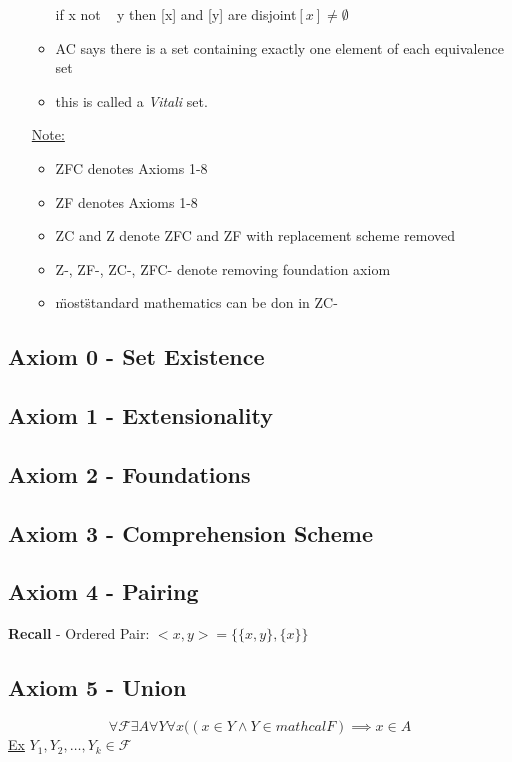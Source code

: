 \documentclass{article}
\begin{document}
\begin{itemize}
\begin{itemize}
            if x not ~ y then [x] and [y] are disjoint$ [x] \neq \emptyset$
            \item AC says there is a set containing exactly one element of each equivalence set
            \item this is called a \emph{Vitali} set.
        \end{itemize}

        \underline{Note:}
        \begin{itemize}
            \item ZFC denotes Axioms 1-8
            \item ZF denotes Axioms 1-8
            \item ZC and Z denote ZFC and ZF with replacement scheme removed
            \item Z-, ZF-, ZC-, ZFC- denote removing foundation axiom
            \item \"most\" standard mathematics can be don in ZC-
        \end{itemize}

    \end{itemize}


    \subsection{Axiom 0 - Set Existence}
    \subsection{Axiom 1 - Extensionality}
    \subsection{Axiom 2 - Foundations}
    \subsection{Axiom 3 - Comprehension Scheme}
    \subsection{Axiom 4 - Pairing}

    \textbf{Recall} - Ordered Pair: $<x,y> = \{\{x,y\},\{x\}\}$

    \subsection{Axiom 5 - Union}
    \[\forall \mathcal{F} \exists A \forall Y \forall x ((x \in Y \wedge Y \in mathcal{F}) \implies x \in A
    \]
    \underline{Ex} $Y_1, Y_2, \dots, Y_k \in \mathcal{F}$
\end{document}

